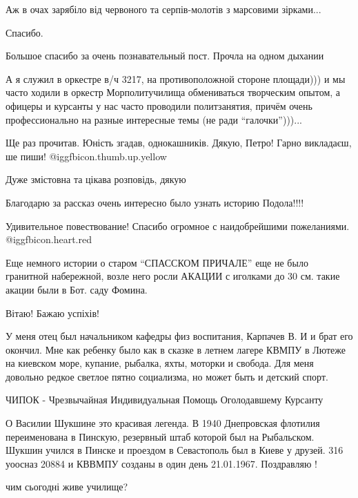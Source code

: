 \begin{itemize}
Аж в очах зарябіло від червоного та серпів-молотів з марсовими зірками...

Спасибо.

Большое спасибо за очень познавательный пост. Прочла на одном дыхании


А я служил в оркестре в/ч 3217, на противоположной стороне площади))) и мы
часто ходили в оркестр Морполитучилища обмениваться творческим опытом, а
офицеры и курсанты у нас часто проводили политзанятия, причём очень
профессионально на разные интересные темы (не ради \enquote{галочки})))...

Ще раз прочитав. Юність згадав, однокашників. Дякую, Петро! Гарно викладаєш, ше
пиши! @igg{fbicon.thumb.up.yellow} 

Дуже змістовна та цікава розповідь, дякую

Благодарю за рассказ очень интересно было узнать историю Подола!!!!

Удивительное повествование! Спасибо огромное с наидобрейшими пожеланиями.
@igg{fbicon.heart.red}


Еще немного истории о старом \enquote{СПАССКОМ ПРИЧАЛЕ} еще не было гранитной
набережной, возле него росли АКАЦИИ с иголками до 30 см. такие акации были в
Бот. саду Фомина.

Вітаю! Бажаю успіхів!


У меня отец был начальником кафедры физ воспитания, Карпачев В. И и брат его
окончил. Мне как ребенку было как в сказке в летнем лагере КВМПУ в Лютеже на
киевском море, купание, рыбалка, яхты, моторки и свобода. Для меня довольно редкое
светлое пятно социализма, но может быть и детский спорт.


ЧИПОК - Чрезвычайная Индивидуальная Помощь Оголодавшему Курсанту


О Василии Шукшине это красивая легенда. В 1940 Днепровская флотилия
переименована в Пинскую, резервный штаб которой был на Рыбальском. Шукшин
учился в Пинске и проездом в Севастополь был в Киеве у друзей. 316 уоосназ
20884 и КВВМПУ созданы в один день 21.01.1967. Поздравляю !

чим сьогодні живе училище?


\end{itemize}
